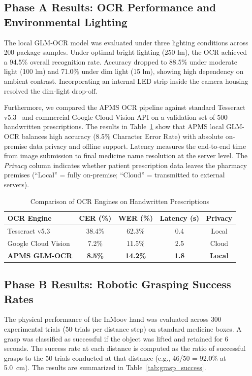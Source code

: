 \documentclass[conference]{IEEEtran}
\begin{document}
\subsection{Phase A Results: OCR Performance and Environmental Lighting}
The local GLM-OCR model was evaluated under three lighting conditions across 200 package samples. Under optimal bright lighting (250 lm), the OCR achieved a 94.5\% overall recognition rate. Accuracy dropped to 88.5\% under moderate light (100 lm) and 71.0\% under dim light (15 lm), showing high dependency on ambient contrast. Incorporating an internal LED strip inside the camera housing resolved the dim-light drop-off.

Furthermore, we compared the APMS OCR pipeline against standard Tesseract v5.3~\cite{tesseract} and commercial Google Cloud Vision API on a validation set of 500 handwritten prescriptions. The results in Table~\ref{tab:ocr_comparison} show that APMS local GLM-OCR balances high accuracy (8.5\% Character Error Rate) with absolute on-premise data privacy and offline support. Latency measures the end-to-end time from image submission to final medicine name resolution at the server level. The \emph{Privacy} column indicates whether patient prescription data leaves the pharmacy premises (``Local'' = fully on-premise; ``Cloud'' = transmitted to external servers).

\begin{table}[htbp]
\caption{Comparison of OCR Engines on Handwritten Prescriptions}
\label{tab:ocr_comparison}
\centering
\setlength{\tabcolsep}{4.5pt}
\begin{tabular}{lcccc}
\toprule
\textbf{OCR Engine} & \textbf{CER (\%)} & \textbf{WER (\%)} & \textbf{Latency (s)} & \textbf{Privacy} \\
\midrule
Tesseract v5.3 & 38.4\% & 62.3\% & 0.4 & Local \\
Google Cloud Vision & 7.2\% & 11.5\% & 2.5 & Cloud \\
\textbf{APMS GLM-OCR} & \textbf{8.5\%} & \textbf{14.2\%} & \textbf{1.8} & \textbf{Local} \\
\bottomrule
\end{tabular}
\end{table}

\subsection{Phase B Results: Robotic Grasping Success Rates}
The physical performance of the InMoov hand was evaluated across 300 experimental trials (50 trials per distance step) on standard medicine boxes. A grasp was classified as successful if the object was lifted and retained for 6 seconds. The success rate at each distance is computed as the ratio of successful grasps to the 50 trials conducted at that distance (e.g., 46/50 = 92.0\% at 5.0~cm). The results are summarized in Table~\ref{tab:grasp_success}.
\end{document}
